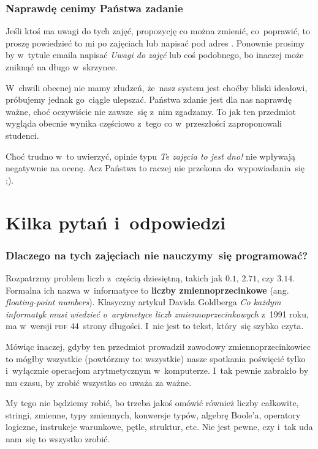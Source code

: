 \documentclass[10pt,t]{beamer}
\begin{document}
\begin{frame}
  \frametitle{Naprawdę cenimy Państwa zadanie}


  Jeśli ktoś ma uwagi do tych zajęć, propozycję co można zmienić,
  co~poprawić, to proszę powiedzieć to mi po zajęciach lub napisać pod
  adres \email. Ponownie prosimy by w~tytule emaila napisać
  \textit{Uwagi do zajęć} lub coś podobnego, bo inaczej może zniknąć na
  długo w~skrzynce.

  W~chwili obecnej nie mamy złudzeń, że~nasz system jest choćby bliski
  ideałowi, próbujemy jednak go~ciągle ulepszać. Państwa zdanie jest dla
  nas naprawdę \alert{ważne}, choć oczywiście nie zawsze~się z~nim zgadzamy.
  To jak ten przedmiot wygląda obecnie wynika częściowo z~tego co
  w~przeszłości zaproponowali studenci.

  Choć trudno w~to uwierzyć, opinie typu \textit{Te zajęcia to jest dno!}
  nie wpływają negatywnie na ocenę. Acz Państwa to raczej nie przekona
  do~wypowiadania~się ;).

\end{frame}










\section{Kilka pytań i~odpowiedzi}


\begin{frame}
  \frametitle{Dlaczego na tych zajęciach nie nauczymy~się
    programować?}


  Rozpatrzmy problem liczb z~częścią dziesiętną, takich jak $0.1$, $2.71$,
  czy $3.14$. Formalna ich nazwa w~informatyce to \textbf{liczby
    zmiennoprzecinkowe} (ang. \textit{floating-point numbers}). Klasyczny
  artykuł Davida Goldberga
  {\textit{Co każdym informatyk musi wiedzieć o~arytmetyce liczb
      zmiennoprzecinkowych}} z~1991 roku, ma w~wersji \textsc{pdf}
  $44$~strony długości. I~nie jest to tekst, który~się szybko czyta.

  Mówiąc inaczej, gdyby ten przedmiot prowadził zawodowy
  zmiennoprzecinkowiec to mógłby \alert{wszystkie} (powtórzmy to:
  wszystkie) nasze spotkania poświęcić tylko i~wyłącznie operacjom
  arytmetycznym w~komputerze. I~tak pewnie zabrakło by mu czasu, by zrobić
  wszystko co uważa za ważne.

  My tego nie będziemy robić, bo trzeba jakoś omówić również liczby
  całkowite, stringi, zmienne, typy zmiennych, konwersje typów, algebrę
  Boole’a, operatory logiczne, instrukcje warunkowe, pętle, struktur, etc.
  Nie jest pewne, czy i~tak uda nam~się to wszystko zrobić.

\end{frame}
\end{document}
